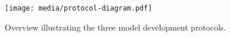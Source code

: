 \begin{figure}[H]
    \centering
    \texttt{[image: media/protocol-diagram.pdf]}
    \caption{Overview illustrating the three model development protocols.}
    \label{fig:protocols}
\end{figure}